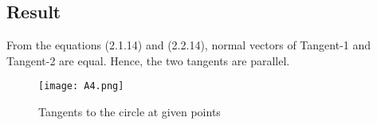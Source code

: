 \documentclass[journal,12pt,twocolumn]{IEEEtran}
\begin{document}
\subsection{Result}
From the equations (2.1.14) and (2.2.14), normal vectors of Tangent-1 and Tangent-2 are equal. \newline 
\centering Hence, the two tangents are parallel.
\begin{figure}[h!]
	\centering
	\texttt{[image: A4.png]}
	\caption{Tangents to the circle at given points}
	\label{myfig}
\end{figure}
\end{document}
